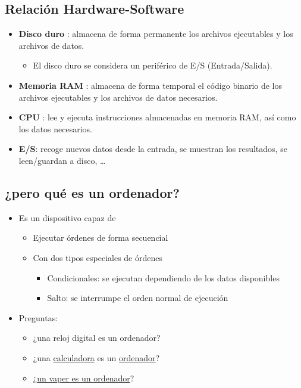 \documentclass[a4paper]{article}
\begin{document}
\subsection{Relación Hardware-Software}
\label{relación-hardware-software}
\begin{itemize}
\item \textbf{Disco duro} : almacena de forma permanente los archivos ejecutables y los archivos de datos.
\begin{itemize}
\item El disco duro se considera un periférico de E/S (Entrada/Salida).
\end{itemize}
\item \textbf{Memoria RAM} : almacena de forma temporal el código binario de los archivos ejecutables y los archivos de datos necesarios.
\item \textbf{CPU} : lee y ejecuta instrucciones almacenadas en memoria RAM, así  como los datos necesarios.
\item \textbf{E/S}: recoge nuevos datos desde la entrada, se muestran los resultados, se leen/guardan a disco, \ldots{}
\end{itemize}
\subsection{¿pero qué es un ordenador?}
\label{sec:org0000003}
\begin{itemize}
\item Es un dispositivo capaz de
\begin{itemize}
\item Ejecutar órdenes de forma secuencial
\item Con dos tipos especiales de órdenes
\begin{itemize}
\item Condicionales: se ejecutan dependiendo de los datos disponibles
\item Salto: se interrumpe el orden normal de ejecución
\end{itemize}
\end{itemize}

\item Preguntas:
\begin{itemize}
\item ¿una reloj digital es un ordenador?
\item ¿una \href{https://www.casio.com/es/scientific-calculators/product.FX-55PLUS/}{calculadora} es un \href{https://www.casio.com/es/scientific-calculators/product.FX-9860GIII/}{ordenador}?
\item ¿\href{https://bogdanthegeek.github.io/blog/projects/vapeserver/}{un vaper es un ordenador}?
\end{itemize}
\end{itemize}
\end{document}
